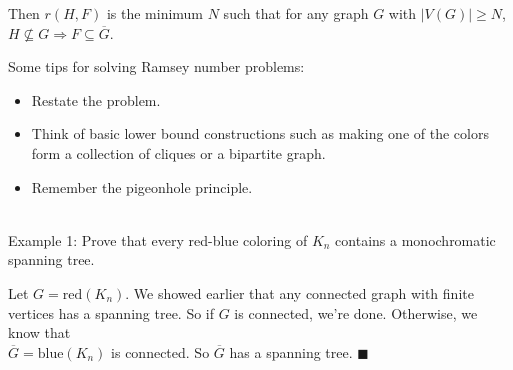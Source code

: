 \documentclass{book}
\newcommand{\teachComment}{
   \color{Orange}%
   \fontsize{12}{14}\selectfont%
}
\newcommand{\exOne}{%
   \color{Purple}%
   \fontsize{14}{16}\selectfont%
}
\newcommand{\exTwo}{%
   \color{RedViolet}%
   \fontsize{13}{15}\selectfont%
}
\newenvironment{myIndent}{%
   \begin{adjustwidth}{2.5em}{0em}%
}{%
   \end{adjustwidth}%
}
\newcommand{\mySepTwo}[1][.]{%
   {\noindent\color{#1}{\rule{6.5in}{0.5mm}}}\\%
}
\newcommand{\retTwo}{\hfill\bigbreak}
\begin{document}
Then $r(H, F)$ is the minimum $N$ such that for any graph $G$ with $|V(G)| \geq N$,\\ [-3pt] $H \not\subseteq G \Longrightarrow F \subseteq \overbar{G}$.

\newpage
\teachComment
Some tips for solving Ramsey number problems:
\begin{itemize}
   \item Restate the problem.
   \item Think of basic lower bound constructions such as making one of the colors form a collection of cliques or a bipartite graph.
   \item Remember the pigeonhole principle.
\end{itemize}

\exOne%
\mySepTwo

Example 1: Prove that every red-blue coloring of $K_n$ contains a monochromatic\\ spanning tree.
{\begin{myIndent} \exTwo
   Let $G = \mathrm{red}(K_n)$. We showed earlier that any connected graph with finite vertices has a spanning tree. So if $G$ is connected, we're done. Otherwise, we know that\\ [-3pt] $\overbar{G} = \mathrm{blue}(K_n)$ is connected. So $\overbar{G}$ has a spanning tree. $\blacksquare$\retTwo
\end{myIndent}}
\end{document}
